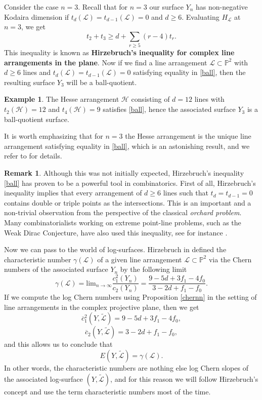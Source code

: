 \documentclass{article}
\theoremstyle{plain}
\theoremstyle{definition}
\newtheorem{remark}[thm]{Remark}
\newtheorem{example}[thm]{Example}
\numberwithin{equation}{section}
\begin{document}
Consider the case $n=3$. Recall that for $n=3$ our surface $Y_{n}$ has non-negative Kodaira dimension if $t_{d}(\mathcal{L}) = t_{d-1}(\mathcal{L})=0$ and $d\geq 6$. 
Evaluating $H_{\mathcal{L}}$ at $n=3$, we get 
\begin{equation}
\label{ball}
t_{2}+t_{3} \geq d +\sum_{r\geq 5}(r-4)t_{r}.
\end{equation}
This inequality is known as \textbf{Hirzebruch's inequality for complex line arrangements in the plane}.
Now if we find a line arrangement $\mathcal{L} \subset \mathbb{P}^{2}$ with $d\geq 6$ lines and $t_{d}(\mathcal{L}) = t_{d-1}(\mathcal{L}) = 0$ satisfying equality in \eqref{ball}, then the resulting surface $Y_{3}$ will be a ball-quotient.
\begin{example}
The Hesse arrangement $\mathcal{H}$ consisting of $d=12$ lines with $t_{2}(\mathcal{H})=12$ and $t_{4}(\mathcal{H})=9$ satisfies \eqref{ball}, hence the associated surface $Y_{3}$ is a ball-quotient surface. 
\end{example}
It is worth emphasizing that for $n=3$ the Hesse arrangement is the unique line arrangement satisfying equality in \eqref{ball}, which is an astonishing result, and we refer to \cite[Kapitel 3.1 G.]{BHH87} for details.
\begin{remark}
Although this was not initially expected, Hirzebruch's inequality \eqref{ball} has proven to be a powerful tool in combinatorics. First of all, Hirzebruch's inequality implies that every arrangement of $d \geq  6$ lines such that $t_{d}=t_{d-1}=0$ contains double or triple points as the intersections. This is an important and a non-trivial observation from the perspective of the classical \textit{orchard problem}. Many combinatorialists working on extreme point-line problems, such as the Weak Dirac Conjecture, have also used this inequality, see for instance \cite{Payne}.
\end{remark}
Now we can pass to the world of log-surfaces. Hirzebruch in \cite{Hirzebruch} defined the characteristic number $\gamma(\mathcal{L})$ of a given line arrangement $\mathcal{L} \subset \mathbb{P}^{2}$ via the Chern numbers of the associated surface $Y_{n}$ by the following limit
\begin{equation}\label{eq:limit_gamma}
\gamma(\mathcal{L}) = \textrm{lim}_{n \rightarrow \infty} \frac{c_{1}^{2}(Y_{n})}{c_{2}(Y_{n})} = \frac{9-5d + 3f_{1} - 4f_{0}}{3-2d + f_{1}-f_{0}}.
\end{equation}
If we compute the log Chern numbers using Proposition \ref{chernn} in the setting of line arrangements in the complex projective plane, then we get
\[\overline{c}_{1}^{2}(Y,\widetilde{\mathcal{L}}) = 9 - 5d + 3f_{1} - 4f_{0},\]
\[\overline{c}_{2}(Y,\widetilde{\mathcal{L}}) = 3 - 2d + f_{1} -f_{0},\]
and this allows us to conclude that 
\[E(Y, \widetilde{\mathcal{L}}) = \gamma(\mathcal{L}).\] 
In other words, the characteristic numbers are nothing else log Chern slopes of the associated log-surface $(Y,\widetilde{\mathcal{L}})$, and for this reason we will follow Hirzebruch's concept and use the term characteristic numbers most of the time.
\end{document}
